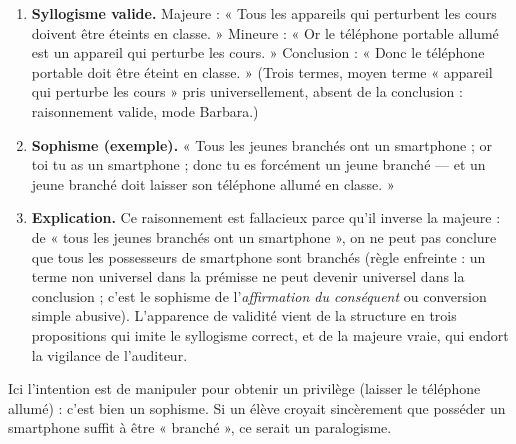 \documentclass[11pt]{article}
\newcommand{\cle}[1]{{\popxbold\color{popdark}#1}}
\begin{document}
\begin{corrige}
\begin{enumerate}
\item \textbf{Syllogisme valide.} Majeure : « Tous les appareils qui perturbent les cours doivent être éteints en classe. » Mineure : « Or le téléphone portable allumé est un appareil qui perturbe les cours. » Conclusion : « Donc le téléphone portable doit être éteint en classe. » (Trois termes, moyen terme « appareil qui perturbe les cours » pris universellement, absent de la conclusion : raisonnement valide, mode Barbara.)
\item \textbf{Sophisme (exemple).} « Tous les jeunes branchés ont un smartphone ; or toi tu as un smartphone ; donc tu es forcément un jeune branché — et un jeune branché doit laisser son téléphone allumé en classe. »
\item \textbf{Explication.} Ce raisonnement est fallacieux parce qu'il inverse la majeure : de « tous les jeunes branchés ont un smartphone », on ne peut pas conclure que tous les possesseurs de smartphone sont branchés (règle enfreinte : un terme non universel dans la prémisse ne peut devenir universel dans la conclusion ; c'est le sophisme de l'\emph{affirmation du conséquent} ou conversion simple abusive). L'apparence de validité vient de la structure en trois propositions qui imite le syllogisme correct, et de la majeure vraie, qui endort la vigilance de l'auditeur.
\end{enumerate}
\end{corrige}

\begin{attention}
Ici l'intention est de manipuler pour obtenir un privilège (laisser le téléphone allumé) : c'est bien un \cle{sophisme}. Si un élève croyait sincèrement que posséder un smartphone suffit à être « branché », ce serait un \cle{paralogisme}.
\end{attention}
\end{document}
